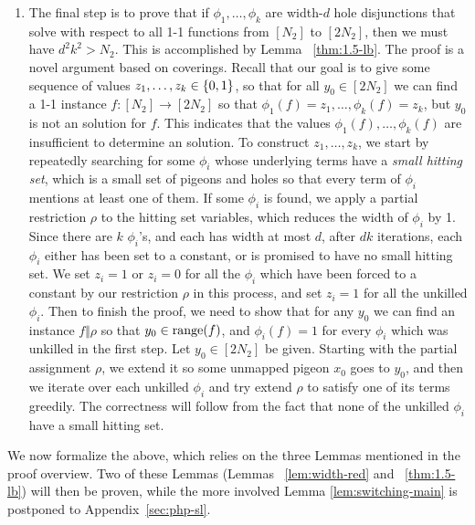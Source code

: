 \begin{enumerate}
 \item The final step is to prove that if $\phi_1,\ldots,\phi_k$ are width-$d$ hole disjunctions that solve \avoid with respect to all 1-1 functions from $[N_2]$ to $[2N_2]$, then we must have $d^2k^2 > N_2$.
 This is accomplished by Lemma ~\ref{thm:1.5-lb}. The proof is a novel argument based on coverings. Recall that our goal is to give some sequence of values $z_1, \ldots, z_k \in \{0,1\}$, so that for all $y_0 \in [2N_2]$ we can find a 1-1 instance $f: [N_2] \to [2N_2]$ so that $\phi_1(f)=z_1, \ldots,\phi_k(f)=z_k$, but $y_0$ is not an \avoid solution for $f$. This indicates that the values $\phi_1(f), \ldots,\phi_k(f)$ are insufficient to determine an \avoid solution. To construct $z_1,\ldots,z_k$, we start by repeatedly searching for some $\phi_i$ whose underlying terms have a \emph{small hitting set}, which is a small set of pigeons and holes so that every term of $\phi_i$ mentions at least one of them. If some $\phi_i$ is found, we apply a partial restriction $\rho$ to the hitting set variables, which reduces the width of $\phi_i$ by 1.
 Since there are $k$ $\phi_i$'s, and each has width at most $d$, after $dk$ iterations, each $\phi_i$ either has been set to a constant, or is promised to have no small hitting set. We set $z_i = 1$ or $z_i = 0$ for all the $\phi_i$ which have been forced to a constant by our restriction $\rho$ in this process, and set $z_i=1$ for all the unkilled $\phi_i$. Then to finish the proof, we need to show that for any $y_0$ we can find an instance $f \Vert \rho$ so that $y_0 \in \mathrm{range}(f)$, and $\phi_i(f)=1$ for every $\phi_i$ which was unkilled in the first step. Let $y_0 \in [2N_2]$ be given. Starting with the partial assignment $\rho$, we extend it so some unmapped pigeon $x_0$ goes to $y_0$, and then we iterate over each unkilled $\phi_i$ and try extend $\rho$ to satisfy one of its terms greedily. The correctness will follow from the fact that none of the unkilled $\phi_i$ have a small hitting set.
 \end{enumerate}
 
 We now formalize the above, which relies on the three Lemmas mentioned in the proof overview. 
 Two of these Lemmas (Lemmas ~\ref{lem:width-red} and ~\ref{thm:1.5-lb}) will then be proven, while the more involved Lemma \ref{lem:switching-main} is postponed to Appendix~\ref{sec:php-sl}. 
 
